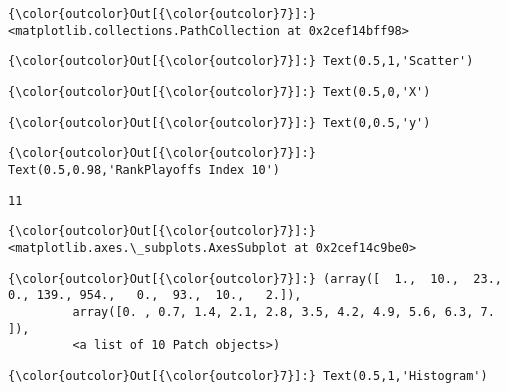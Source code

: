 \documentclass[11pt]{article}
\begin{document}
\begin{Verbatim}[commandchars=\\\{\}]
{\color{outcolor}Out[{\color{outcolor}7}]:} <matplotlib.collections.PathCollection at 0x2cef14bff98>
\end{Verbatim}
            
\begin{Verbatim}[commandchars=\\\{\}]
{\color{outcolor}Out[{\color{outcolor}7}]:} Text(0.5,1,'Scatter')
\end{Verbatim}
            
\begin{Verbatim}[commandchars=\\\{\}]
{\color{outcolor}Out[{\color{outcolor}7}]:} Text(0.5,0,'X')
\end{Verbatim}
            
\begin{Verbatim}[commandchars=\\\{\}]
{\color{outcolor}Out[{\color{outcolor}7}]:} Text(0,0.5,'y')
\end{Verbatim}
            
\begin{Verbatim}[commandchars=\\\{\}]
{\color{outcolor}Out[{\color{outcolor}7}]:} Text(0.5,0.98,'RankPlayoffs Index 10')
\end{Verbatim}
            
    \begin{Verbatim}[commandchars=\\\{\}]
11

    \end{Verbatim}

\begin{Verbatim}[commandchars=\\\{\}]
{\color{outcolor}Out[{\color{outcolor}7}]:} <matplotlib.axes.\_subplots.AxesSubplot at 0x2cef14c9be0>
\end{Verbatim}
            
\begin{Verbatim}[commandchars=\\\{\}]
{\color{outcolor}Out[{\color{outcolor}7}]:} (array([  1.,  10.,  23.,   0., 139., 954.,   0.,  93.,  10.,   2.]),
         array([0. , 0.7, 1.4, 2.1, 2.8, 3.5, 4.2, 4.9, 5.6, 6.3, 7. ]),
         <a list of 10 Patch objects>)
\end{Verbatim}
            
\begin{Verbatim}[commandchars=\\\{\}]
{\color{outcolor}Out[{\color{outcolor}7}]:} Text(0.5,1,'Histogram')
\end{Verbatim}
            
\end{document}
